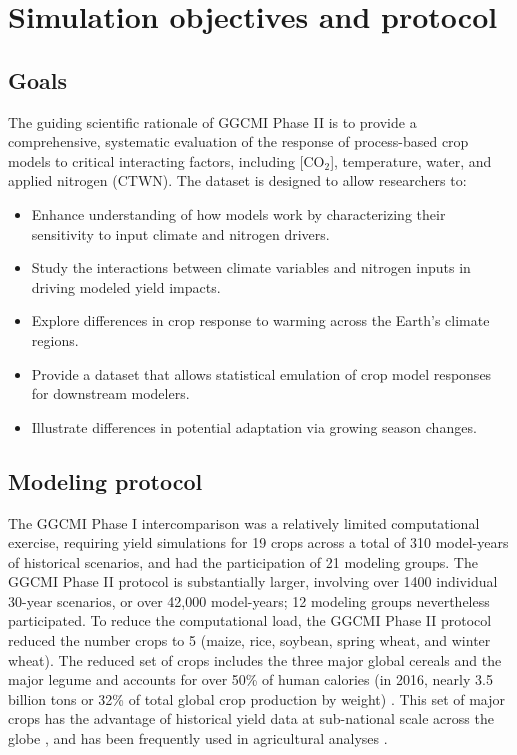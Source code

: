 \documentclass[gmd, manuscript]{copernicus} %
\begin{document}
\section{Simulation objectives and protocol}
\label{S:2}
\subsection{Goals}

The guiding scientific rationale of GGCMI Phase II is to provide a comprehensive, systematic evaluation of the response of process-based crop models to critical interacting factors, including [CO$_2$], temperature, water, and applied nitrogen (CTWN). 
The dataset is designed to allow researchers to:
\begin{itemize}
    \item Enhance understanding of how models work by characterizing their sensitivity to input climate and nitrogen drivers.
    \item Study the interactions between climate variables and nitrogen inputs in driving modeled yield impacts. 
    \item Explore differences in crop response to warming across the Earth's climate regions.
    \item Provide a dataset that allows statistical emulation of crop model responses for downstream modelers.
    \item Illustrate differences in potential adaptation via growing season changes. 
\end{itemize}
\vspace{-0.05in}

\subsection{Modeling protocol}
The GGCMI Phase I intercomparison was a relatively limited computational exercise, requiring yield simulations for 19 crops across a total of 310 model-years of historical scenarios, and had the participation of 21 modeling groups.
The GGCMI Phase II protocol is substantially larger, involving over 1400 individual 30-year scenarios, or over 42,000 model-years; 12 modeling groups nevertheless participated. To reduce the computational load, the GGCMI Phase II protocol reduced the number crops to 5 (maize, rice, soybean, spring wheat, and winter wheat). 
The reduced set of crops includes the three major global cereals and the major legume and accounts for over 50\% of human calories (in 2016, nearly 3.5 billion tons or 32\% of total global crop production by weight) \citep{FAOSTAT}. This set of major crops has the advantage of  historical yield data at sub-national scale across the globe \citep{Ray2012,iizumi_historical_2014}, and has been frequently used in agricultural analyses \citep[e.g.][]{muller_global_2017,porwollik_spatial_2016}.  %
\end{document}

